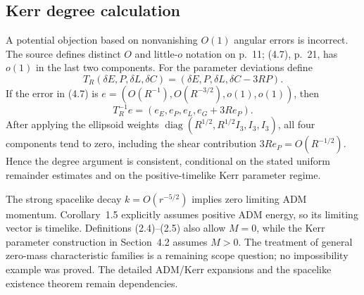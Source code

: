 \documentclass[10pt]{article}
\begin{document}
\subsection*{Kerr degree calculation}
A potential objection based on nonvanishing \(O(1)\) angular errors is incorrect. The source defines distinct \(O\) and little-\(o\) notation on p. 11; (4.7), p. 21, has \(o(1)\) in the last two components. For the parameter deviations define \[T_R(\delta E,P,\delta L,\delta C)
       =(\delta E,P,\delta L,\delta C-3RP).\] If the error in (4.7) is \(e=(O(R^{-1}),O(R^{-3/2}),o(1),o(1))\), then \[T_R^{-1}e=(e_E,e_P,e_L,e_G+3Re_P).\] After applying the ellipsoid weights \(\operatorname{diag}(R^{1/2},R^{1/2}I_3,I_3,I_3)\), all four components tend to zero, including the shear contribution \(3Re_P=O(R^{-1/2})\). Hence the degree argument is consistent, conditional on the stated uniform remainder estimates and on the positive-timelike Kerr parameter regime.\par
The strong spacelike decay \(k=O(r^{-5/2})\) implies zero limiting ADM momentum. Corollary 1.5 explicitly assumes positive ADM energy, so its limiting vector is timelike. Definitions (2.4)–(2.5) also allow \(M=0\), while the Kerr parameter construction in Section 4.2 assumes \(M>0\). The treatment of general zero-mass characteristic families is a remaining scope question; no impossibility example was proved. The detailed ADM/Kerr expansions and the spacelike existence theorem remain dependencies.\par
\end{document}
